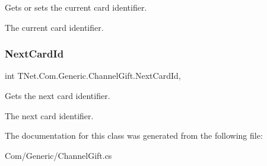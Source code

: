 Gets or sets the current card identifier. 

The current card identifier.\mbox{\label{class_t_net_1_1_com_1_1_generic_1_1_channel_gift_a0f190a3a2f0577760011efd1be43d085}} 
\subsubsection{\texorpdfstring{Next\+Card\+Id}{NextCardId}}
{\footnotesize\ttfamily int T\+Net.\+Com.\+Generic.\+Channel\+Gift.\+Next\+Card\+Id\hspace{0.3cm}{\ttfamily [get]}, {\ttfamily [protected]}}



Gets the next card identifier. 

The next card identifier.

The documentation for this class was generated from the following file\+:\begin{DoxyCompactItemize}
\item 
Com/\+Generic/Channel\+Gift.\+cs\end{DoxyCompactItemize}
